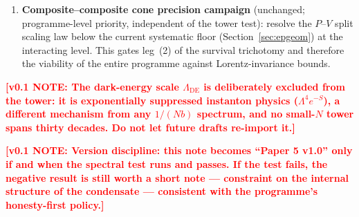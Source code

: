 \documentclass[11pt,a4paper]{article}
\newcommand{\workingnote}[1]{\textcolor{red}{\textbf{[v0.1 NOTE: #1]}}}
\begin{document}
\begin{enumerate}
$N \le 5$ fit of Section~\ref{sec:test} can run, the state list
must be settled under the invariant-universal coupling and the
vector-state caveat: at $G = G_\chi$ the vector channel has no
below-threshold state (companion vector paper), so the candidate
tower presently consists of $m_\pi = 0$, $m_\sigma$, and
whatever the $V/A$ sector contributes on the resonance side.
Whether a two-to-three--state tower constitutes a meaningful test
(kill criterion (ii) of Section~\ref{sec:test} is close to
triggering) is the design question to resolve first; if it
triggers, the negative result is recorded per the version
discipline below.
\item \textbf{Composite--composite cone precision campaign}
(unchanged; programme-level priority, independent of the tower
test): resolve the $P$--$V$ split scaling law below the current
systematic floor (Section~\ref{sec:epgeom}) at the interacting
level.  This gates leg~(2) of the survival trichotomy and
therefore the viability of the entire programme against
Lorentz-invariance bounds.
\end{enumerate}

\workingnote{The dark-energy scale $\Lambda_{\mathrm{DE}}$ is
deliberately excluded from the tower: it is exponentially
suppressed instanton physics ($\Lambda^4 e^{-S}$), a different
mechanism from any $1/(Nb)$ spectrum, and no small-$N$ tower spans
thirty decades. Do not let future drafts re-import it.}

\workingnote{Version discipline: this note becomes ``Paper 5
v1.0'' only if and when the spectral test runs and passes.
If the test fails, the negative result is still worth a short
note --- constraint on the internal structure of the condensate
--- consistent with the programme's honesty-first policy.}
\end{document}
